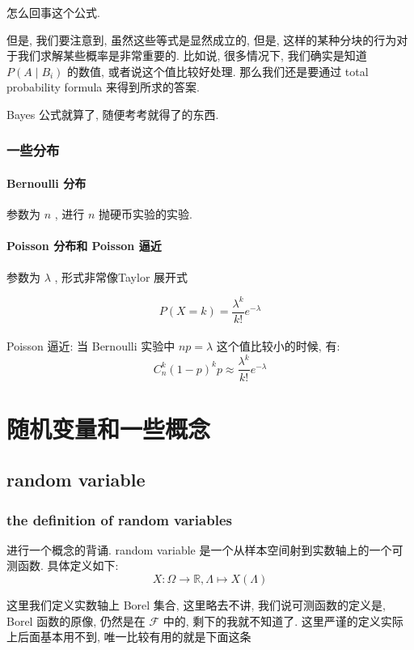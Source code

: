 \documentclass[a4paper, 10pt]{ctexart} %
\begin{document}
怎么回事这个公式. 

但是, 我们要注意到, 虽然这些等式是显然成立的, 但是, 这样的某种分块的行为对于我们求解某些概率是非常重要的. 
比如说, 很多情况下, 我们确实是知道 $P\left(A\mid B_{i}\right)$ 的数值, 或者说这个值比较好处理. 那么我们还是要通过 total probability formula 来得到所求的答案. 

Bayes 公式就算了, 随便考考就得了的东西. 

\subsubsection{一些分布}
\paragraph{Bernoulli 分布}
参数为 $n$ , 进行 $n$ 抛硬币实验的实验. 
\paragraph{Poisson 分布和 Poisson 逼近}
参数为 $\lambda$ , 形式非常像Taylor 展开式

\begin{equation}
P\left(X = k\right) = \frac{\lambda^{k}}{k!} e^{-\lambda}
\end{equation}\\
Poisson 逼近: 当 Bernoulli 实验中 $n  p = \lambda$ 这个值比较小的时候, 有:
\begin{equation}
C_{n}^{k} \left(1 - p\right)^{k} p \approx \frac{\lambda^{k}}{k!} e^{-\lambda}   
\end{equation}
\section{随机变量和一些概念}
\subsection{random variable}
\subsubsection{the definition of random variables}
进行一个概念的背诵. 
random variable 是一个从样本空间射到实数轴上的一个可测函数. 具体定义如下:
\[
X : \Omega\to \mathbb{R},  \Lambda \mapsto X\left(\Lambda\right)
\]

这里我们定义实数轴上 Borel 集合, 这里略去不讲, 我们说可测函数的定义是, Borel 函数的原像, 仍然是在 $\mathscr F$ 中的, 剩下的我就不知道了. 
这里严谨的定义实际上后面基本用不到, 唯一比较有用的就是下面这条
\end{document}
